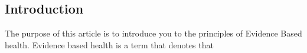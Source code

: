 \subsection{Introduction}


The purpose of this article is to introduce you to the principles of Evidence Based health. Evidence based health is a term that denotes that 
